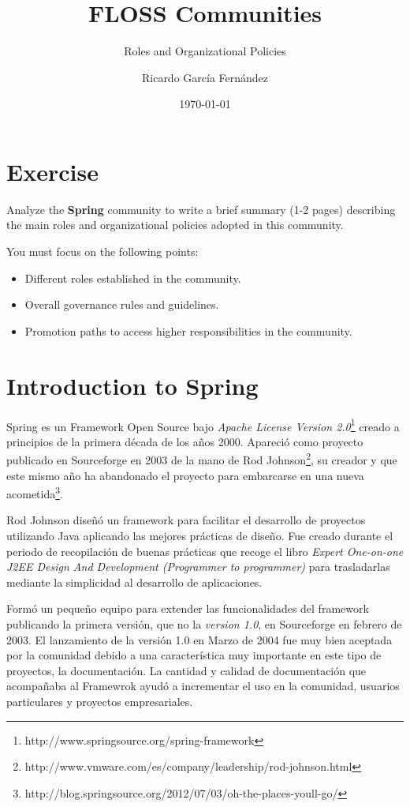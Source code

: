 \documentclass[11pt]{scrartcl}
\title{\textbf{FLOSS Communities}}
\subtitle{Roles and Organizational Policies}
\author{Ricardo Garc\'ia Fern\'andez}
\date{\today}
\begin{document}
\maketitle

\section{Exercise}

Analyze the \textbf{Spring} community to write a brief summary (1-2 pages) describing the main roles and organizational policies adopted in this community.

You must focus on the following points:

\begin{itemize}
    \item Different roles established in the community.
    \item Overall governance rules and guidelines.
    \item Promotion paths to access higher responsibilities in the community.
\end{itemize}

\section{Introduction to Spring}

Spring es un Framework Open Source bajo \emph{Apache License Version 2.0}\footnote{http://www.springsource.org/spring-framework} creado a principios de la primera d\'ecada de los a\~nos 2000. Apareci\'o como proyecto publicado en Sourceforge en 2003 de la mano de Rod Johnson\footnote{http://www.vmware.com/es/company/leadership/rod-johnson.html}, su creador y que este mismo a\~no ha abandonado el proyecto para embarcarse en una nueva acometida\footnote{http://blog.springsource.org/2012/07/03/oh-the-places-youll-go/}.

Rod Johnson dise\~n\'o un framework para facilitar el desarrollo de proyectos utilizando Java aplicando las mejores pr\'acticas de dise\~no. Fue creado durante el periodo de recopilaci\'on de buenas pr\'acticas que recoge el libro \emph{Expert One-on-one J2EE Design And Development (Programmer to programmer)} para trasladarlas mediante la simplicidad al desarrollo de aplicaciones.

Form\'o un peque\~no equipo para extender las funcionalidades del framework publicando la primera versi\'on, que no la \emph{version 1.0}, en Sourceforge en febrero de 2003. El lanzamiento de la versi\'on 1.0 en Marzo de 2004 fue muy bien aceptada por la comunidad debido a una caracter\'istica muy importante en este tipo de proyectos, la documentaci\'on. La cantidad y calidad de documentaci\'on que acompa\~naba al Framewrok ayud\'o a incrementar el uso en la comunidad, usuarios particulares y proyectos empresariales.
\end{document}
